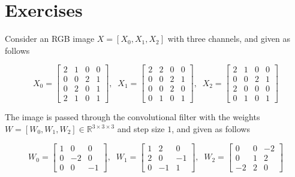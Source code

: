 \section{Exercises}

  \begin{example}
    \label{ex:tarokh-duke-ece685}
    Consider an RGB image $X = [X_0, X_1, X_2]$ with three channels, and given as follows 

    \begin{equation}
      X_0 = \begin{bmatrix} 2 & 1 & 0 & 0 \\ 0 & 0 & 2 & 1 \\ 0 & 2 & 0 & 1 \\ 2 & 1 & 0 & 1 \end{bmatrix}, \;\; 
      X_1 = \begin{bmatrix} 2 & 2 & 0 & 0 \\ 0 & 0 & 2 & 1 \\ 0 & 0 & 2 & 0 \\ 0 & 1 & 0 & 1 \end{bmatrix}, \;\; 
      X_2 = \begin{bmatrix} 2 & 1 & 0 & 0 \\ 0 & 0 & 2 & 1 \\ 2 & 0 & 0 & 0 \\ 0 & 1 & 0 & 1 \end{bmatrix}
      \label{eq:tarokh_conv_exercise}
    \end{equation}
    
    The image is passed through the convolutional filter with the weights $W = [W_0, W_1, W_2] \in \mathbb{R}^{3 \times 3 \times 3}$ and step size $1$, and given as follows 

    \begin{equation}
      W_0 = \begin{bmatrix} 1 & 0 & 0 \\ 0 & -2 & 0 \\ 0 & 0 & -1 \end{bmatrix}, \;\; 
      W_1 = \begin{bmatrix} 1 & 2 & 0 \\ 2 & 0 & - 1 \\ 0 & -1 & 1 \end{bmatrix}, \;\; 
      W_2 = \begin{bmatrix} 0 & 0 & -2 \\ 0 & 1 & 2 \\ -2 & 2 & 0 \end{bmatrix} 
      \label{eq:tarokh_conv_exercise2}
    \end{equation}   


\end{example}
